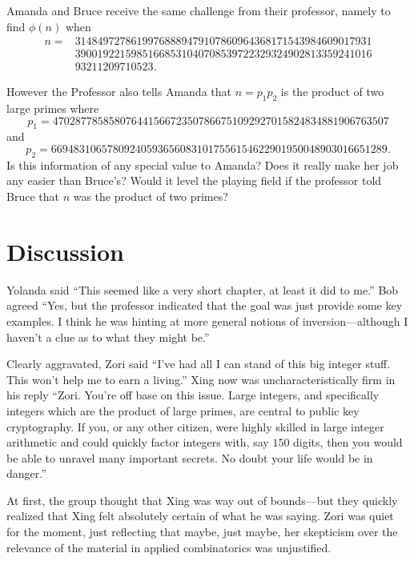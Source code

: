 \begin{example}
Amanda and Bruce receive the same challenge from their professor, namely
to find $\phi(n)$ when 
\begin{align*}
n  = &31484972786199768889479107860964368171543984609017931\\
   &  39001922159851668531040708539722329324902813359241016\\
   &  93211209710523.
\end{align*}

However the Professor also tells Amanda that $n=p_1p_2$ is the product
of two large primes where
\[
p_1 = 470287785858076441566723507866751092927015824834881906763507
\]
and
\[
p_2 = 669483106578092405936560831017556154622901950048903016651289.
\]
Is this information of any special value to Amanda?  Does it really make
her job any easier than Bruce's?  Would it level the playing field
if the professor told Bruce that $n$ was the product of two primes?
\end{example}

\section{Discussion}

Yolanda said ``This seemed like a very short chapter, at least it did to
me.''  Bob agreed ``Yes, but the professor indicated that the goal
was just provide some key examples.  I think he was hinting at more
general notions of inversion---although I haven't a clue as to what
they might be.''

Clearly aggravated, Zori said ``I've had all I can stand of
this big integer stuff.  This won't help me to earn a living.''
Xing now was uncharacteristically firm in his reply ``Zori.
You're off base on this issue.  Large integers, and specifically
integers which are the product of large primes, are central to
public key cryptography.  If you, or any other citizen, were
highly skilled in large integer arithmetic and could quickly
factor integers with, say $150$ digits, then you would be able
to unravel many important secrets.  No doubt your life would
be in danger.''

At first, the group thought that Xing was way out of bounds---but
they quickly realized that Xing felt absolutely certain of what he
was saying.  Zori was quiet for the moment, just reflecting
that maybe, just maybe, her skepticism over the relevance
of the material in applied combinatorics was unjustified. 

